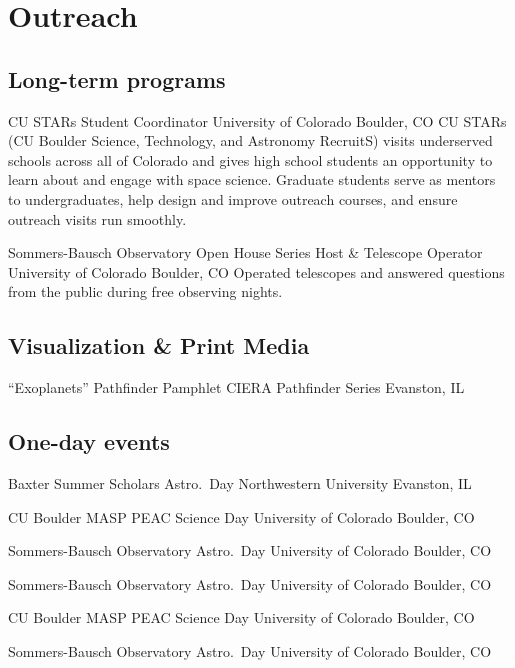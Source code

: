 \section{Outreach}

\subsection{Long-term programs}

		{CU STARs}
		{Student Coordinator}
		{University of Colorado}
		{Boulder, CO}
		{
		CU STARs (CU Boulder Science, Technology, and Astronomy RecruitS) visits underserved schools across all of Colorado and gives high school students an opportunity to learn about and engage with space science.
		Graduate students serve as mentors to undergraduates, help design and improve outreach courses, and ensure outreach visits run smoothly.
    	}

    {Sommers-Bausch Observatory Open House Series}
    {Host \& Telescope Operator}
    {University of Colorado}    
	{Boulder, CO}
    {Operated telescopes and answered questions from the public during free observing nights.    }


\vspace{0.25cm}
\subsection{Visualization \& Print Media}
		{``Exoplanets'' Pathfinder Pamphlet}
		{}
		{CIERA Pathfinder Series}
		{Evanston, IL}
		{}

\vspace{0.25cm}
\subsection{One-day events}

		{Baxter Summer Scholars Astro.~Day}
		{}
		{Northwestern University}
		{Evanston, IL}
		{}


		{CU Boulder MASP PEAC Science Day}
		{}
		{University of Colorado}
		{Boulder, CO}
		{}

\cventry{}
		{Sommers-Bausch Observatory Astro.~Day}
		{}
		{University of Colorado}
		{Boulder, CO}
		{}

		{Sommers-Bausch Observatory Astro.~Day}
		{}
		{University of Colorado}
		{Boulder, CO}
		{}

		{CU Boulder MASP PEAC Science Day}
		{}
		{University of Colorado}
		{Boulder, CO}
		{}

\cventry{}
		{Sommers-Bausch Observatory Astro.~Day}
		{}
		{University of Colorado}
		{Boulder, CO}
		{}



